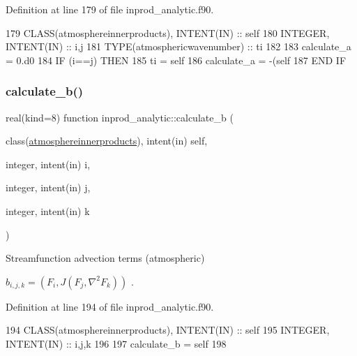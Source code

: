 Definition at line 179 of file inprod\+\_\+analytic.\+f90.


\begin{DoxyCode}
179     \textcolor{keywordtype}{CLASS}(atmosphereinnerproducts), \textcolor{keywordtype}{INTENT(IN)} :: self
180     \textcolor{keywordtype}{INTEGER}, \textcolor{keywordtype}{INTENT(IN)} :: i,j
181     \textcolor{keywordtype}{TYPE}(atmosphericwavenumber) :: ti
182     
183     calculate\_a = 0.d0
184     \textcolor{keywordflow}{IF} (i==j) \textcolor{keywordflow}{THEN}
185       ti = self%
186       calculate\_a = -(self%
187 \textcolor{keywordflow}{    END IF}
\end{DoxyCode}
\mbox{\label{namespaceinprod__analytic_a5608ef2b86882c7055455fbd785a8f84}} 
\subsubsection{\texorpdfstring{calculate\+\_\+b()}{calculate\_b()}}
{\footnotesize\ttfamily real(kind=8) function inprod\+\_\+analytic\+::calculate\+\_\+b (\begin{DoxyParamCaption}\item[{class(\hyperlink{structinprod__analytic_1_1atmosphereinnerproducts}{atmosphereinnerproducts}), intent(in)}]{self,  }\item[{integer, intent(in)}]{i,  }\item[{integer, intent(in)}]{j,  }\item[{integer, intent(in)}]{k }\end{DoxyParamCaption})\hspace{0.3cm}{\ttfamily [private]}}



Streamfunction advection terms (atmospheric) 

$ b_{i,j,k} = (F_i, J(F_j, \nabla^2 F_k))$ . 

Definition at line 194 of file inprod\+\_\+analytic.\+f90.


\begin{DoxyCode}
194     \textcolor{keywordtype}{CLASS}(atmosphereinnerproducts), \textcolor{keywordtype}{INTENT(IN)} :: self
195     \textcolor{keywordtype}{INTEGER}, \textcolor{keywordtype}{INTENT(IN)} :: i,j,k
196 
197     calculate\_b = self%
198 
\end{DoxyCode}
\mbox{\label{namespaceinprod__analytic_aa0b310b730d6df3d09a565a09aa62a22}} 
